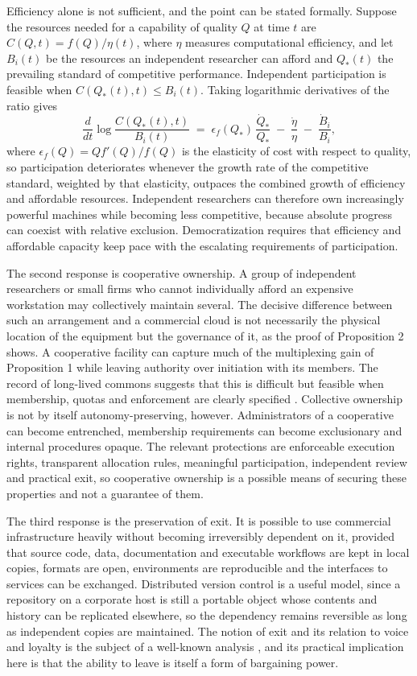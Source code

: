 \documentclass[11pt]{article}
\theoremstyle{plain}
\theoremstyle{definition}
\begin{document}
Efficiency alone is not sufficient, and the point can be stated formally. Suppose the resources needed for a capability of quality $Q$ at time $t$ are $C(Q,t)=f(Q)/\eta(t)$, where $\eta$ measures computational efficiency, and let $B_i(t)$ be the resources an independent researcher can afford and $Q_*(t)$ the prevailing standard of competitive performance. Independent participation is feasible when $C(Q_*(t),t)\le B_i(t)$. Taking logarithmic derivatives of the ratio gives
\[
\frac{d}{dt}\log\frac{C(Q_*(t),t)}{B_i(t)} \;=\; \epsilon_f(Q_*)\,\frac{\dot Q_*}{Q_*} \;-\; \frac{\dot\eta}{\eta} \;-\; \frac{\dot B_i}{B_i},
\]
where $\epsilon_f(Q)=Qf'(Q)/f(Q)$ is the elasticity of cost with respect to quality, so participation deteriorates whenever the growth rate of the competitive standard, weighted by that elasticity, outpaces the combined growth of efficiency and affordable resources. Independent researchers can therefore own increasingly powerful machines while becoming less competitive, because absolute progress can coexist with relative exclusion. Democratization requires that efficiency and affordable capacity keep pace with the escalating requirements of participation.

The second response is cooperative ownership. A group of independent researchers or small firms who cannot individually afford an expensive workstation may collectively maintain several. The decisive difference between such an arrangement and a commercial cloud is not necessarily the physical location of the equipment but the governance of it, as the proof of Proposition 2 shows. A cooperative facility can capture much of the multiplexing gain of Proposition 1 while leaving authority over initiation with its members. The record of long-lived commons suggests that this is difficult but feasible when membership, quotas and enforcement are clearly specified \cite{ostrom,benkler}. Collective ownership is not by itself autonomy-preserving, however. Administrators of a cooperative can become entrenched, membership requirements can become exclusionary and internal procedures opaque. The relevant protections are enforceable execution rights, transparent allocation rules, meaningful participation, independent review and practical exit, so cooperative ownership is a possible means of securing these properties and not a guarantee of them.

The third response is the preservation of exit. It is possible to use commercial infrastructure heavily without becoming irreversibly dependent on it, provided that source code, data, documentation and executable workflows are kept in local copies, formats are open, environments are reproducible and the interfaces to services can be exchanged. Distributed version control is a useful model, since a repository on a corporate host is still a portable object whose contents and history can be replicated elsewhere, so the dependency remains reversible as long as independent copies are maintained. The notion of exit and its relation to voice and loyalty is the subject of a well-known analysis \cite{hirschman}, and its practical implication here is that the ability to leave is itself a form of bargaining power.
\end{document}
